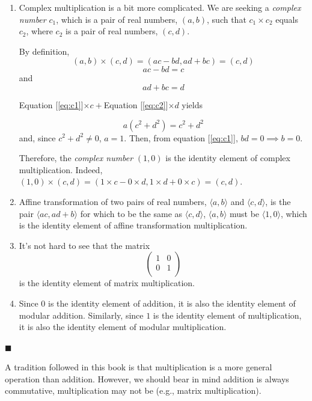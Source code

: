 \documentclass[english,notitlepage,smartquotes]{hgbreport}
\theoremstyle{definition}
\theoremstyle{definition}
\theoremstyle{remark}
\theoremstyle{definition}
\theoremstyle{plain}
\renewcommand\qedsymbol{$\blacksquare$}
\theoremstyle{definition}
\begin{document}
\begin{enumerate}
\item Complex multiplication is a bit more complicated. We are seeking a \emph{complex number} $c_1$, which is a pair of real numbers, $(a,b)$, such that $c_1\times c_2$ equals $c_2$, where $c_2$ is a pair of real numbers, $(c,d)$.

By definition,
$$
(a,b)\times(c,d)=(ac-bd,ad+bc)=(c,d)
$$
\begin{equation}
\label{eq:c1}
ac-bd=c
\end{equation}
and
\begin{equation}
\label{eq:c2}
ad+bc=d
\end{equation}

Equation [\ref{eq:c1}]$\times c+$Equation [\ref{eq:c2}]$\times d$ yields

$$
a(c^2+d^2)=c^2+d^2
$$
and, since $c^2+d^2\ne 0$, $a=1$. Then, from equation [\ref{eq:c1}], $bd=0\implies b=0$.

Therefore, the \emph{complex number} $(1,0)$ is the identity element of complex multiplication. Indeed, $(1,0)\times(c,d)=(1\times c-0\times d,1\times d+0\times c)=(c,d)$.

\item\label{item:affine} Affine transformation of two pairs of real numbers, $\langle a,b\rangle$ and $\langle c,d\rangle$, is the pair $\langle ac,ad+b\rangle$ for which to be the same as $\langle c,d\rangle$, $\langle a,b\rangle$ must be $\langle 1,0\rangle$, which is the identity element of affine transformation multiplication.
\item\label{item:matmultidelem} It's not hard to see that the matrix
\[
  \begin{pmatrix}
    1 & 0\\
    0 & 1\\
  \end{pmatrix}
\] 
is the identity element of matrix multiplication.
\item Since $0$ is the identity element of addition, it is also the identity element of modular addition. Similarly, since $1$ is the identity element of multiplication, it is also the identity element of modular multiplication. 
\end{enumerate}

\qedsymbol

A tradition followed in this book is that multiplication is a more general operation than addition. However, we should bear in mind addition is always commutative, multiplication may not be (e.g., matrix multiplication). 
\end{document}
